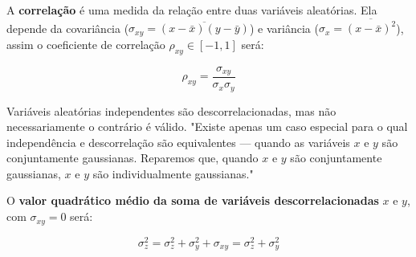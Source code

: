 A \textbf{correlação} é uma medida da relação entre duas variáveis aleatórias. Ela depende da covariância ($\sigma_{xy} = \overline{(x-\bar{x})(y-\bar{y})}$) e variância ($\sigma_{x} = \overline{(x-\bar{x})^2}$), assim o coeficiente de correlação $\rho_{xy} \in [-1,1]$ será:

\begin{equation} \label{lathi:5}
\rho_{xy} = \frac{\sigma_{xy}}{\sigma_{x}\sigma_{y}}
\end{equation}

Variáveis aleatórias independentes são descorrelacionadas, mas não necessariamente o contrário é válido. "Existe apenas um caso especial para o qual independência e descorrelação são equivalentes — quando as variáveis $x$ e $y$ são conjuntamente gaussianas. Reparemos que, quando $x$ e $y$ são conjuntamente gaussianas, $x$ e $y$ são individualmente gaussianas."

O \textbf{valor quadrático médio da soma de variáveis descorrelacionadas} $x$ e $y$, com $\sigma_{xy} = 0$ será:

\begin{equation} \label{lathi:6}
\sigma_{z}^2 = \sigma_{z}^2 + \sigma_{y}^2 + \sigma_{xy} = \sigma_{z}^2 + \sigma_{y}^2 
\end{equation}